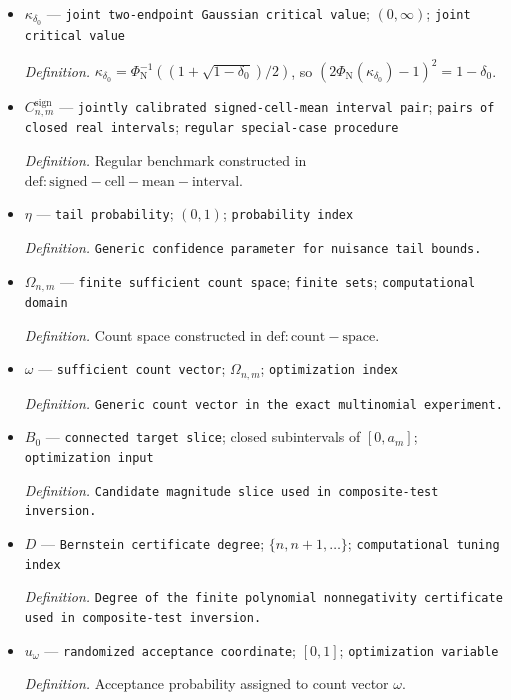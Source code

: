 \documentclass{article}
\begin{document}
\begin{itemize}
  \item \(\kappa_{\delta_0}\) --- \texttt{joint two-\allowbreak{}endpoint Gaussian critical value}; \((0,\infty)\); \texttt{joint critical value}
  \par\smallskip\noindent\emph{Definition.} \(\kappa_{\delta_0}=\Phi_{\mathrm N}^{-1}((1+\sqrt{1-\delta_0})/2)\), so \((2\Phi_{\mathrm N}(\kappa_{\delta_0})-1)^2=1-\delta_0\).
  \item \(C^{\mathrm{sign}}_{n,m}\) --- \texttt{jointly calibrated signed-\allowbreak{}cell-\allowbreak{}mean interval pair}; \texttt{pairs of closed real intervals}; \texttt{regular special-\allowbreak{}case procedure}
  \par\smallskip\noindent\emph{Definition.} Regular benchmark constructed in \(\mathrm{def:signed-cell-mean-interval}\).
  \item \(\eta\) --- \texttt{tail probability}; \((0,1)\); \texttt{probability index}
  \par\smallskip\noindent\emph{Definition.} \texttt{Generic confidence parameter for nuisance tail bounds.}
  \item \(\Omega_{n,m}\) --- \texttt{finite sufficient count space}; \texttt{finite sets}; \texttt{computational domain}
  \par\smallskip\noindent\emph{Definition.} Count space constructed in \(\mathrm{def:count-space}\).
  \item \(\omega\) --- \texttt{sufficient count vector}; \(\Omega_{n,m}\); \texttt{optimization index}
  \par\smallskip\noindent\emph{Definition.} \texttt{Generic count vector in the exact multinomial experiment.}
  \item \(B_0\) --- \texttt{connected target slice}; closed subintervals of \([0,a_m]\); \texttt{optimization input}
  \par\smallskip\noindent\emph{Definition.} \texttt{Candidate magnitude slice used in composite-\allowbreak{}test inversion.}
  \item \(D\) --- \texttt{Bernstein certificate degree}; \(\{n,n+1,\ldots\}\); \texttt{computational tuning index}
  \par\smallskip\noindent\emph{Definition.} \texttt{Degree of the finite polynomial nonnegativity certificate used in composite-\allowbreak{}test inversion.}
  \item \(u_{\omega}\) --- \texttt{randomized acceptance coordinate}; \([0,1]\); \texttt{optimization variable}
  \par\smallskip\noindent\emph{Definition.} Acceptance probability assigned to count vector \(\omega\).

\end{itemize}
\end{document}
